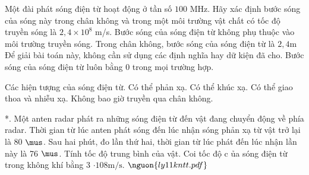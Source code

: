 \begin{ex}Một đài phát sóng điện từ hoạt động ở tần số $100$ MHz. Hãy xác định bước sóng của sóng này trong chân không và trong một môi trường vật chất có tốc độ truyền sóng là $2,4 \times 10^8$ m/s.
\choice
{Bước sóng của sóng điện từ không phụ thuộc vào môi trường truyền sóng.}
{\True Trong chân không, bước sóng của sóng điện từ là $2,4$m}
{Để giải bài toán này, không cần sử dụng các định nghĩa hay dữ kiện đã cho.}
{Bước sóng của sóng điện từ luôn bằng $0$ trong mọi trường hợp.}
\end{ex}

\begin{ex}
Các hiện tượng của sóng điện từ.
\choiceTF
{\True Có thể phản xạ.}
{\True Có thể khúc xạ.}
{\True Có thể giao thoa và nhiễu xạ.}
{Không bao giờ truyền qua chân không.}
\end{ex}

\begin{ex}
*. Một anten radar phát ra những sóng điện từ đến vật đang chuyển động về phía radar. Thời gian từ lúc anten phát sóng đến lúc nhận sóng phản xạ từ vật trở lại là 80 $\mus$. Sau hai phút, đo lần thứ hai, thời gian từ lúc phát đến lúc nhận lần này là 76 $\mus$. Tính tốc độ trung bình của vật. Coi tốc độ c ủa sóng điện từ trong không khí bằng 3 $\cdot108 \mathrm{m/s}$. $\nguon{ly11 kntt.pdf}$
\choiceTF

\end{ex}

